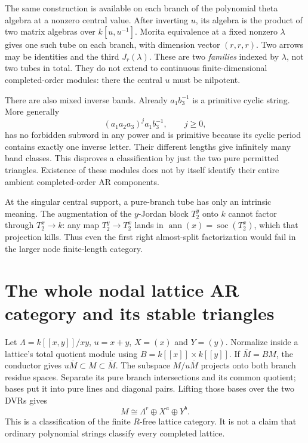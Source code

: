 The same construction is available on each branch of the polynomial theta
algebra at a nonzero central value. After inverting $u$, its algebra is the
product of two matrix algebras over $k[u,u^{-1}]$. Morita equivalence at a
fixed nonzero $\lambda$ gives one such tube on each branch, with dimension
vector $(r,r,r)$. Two arrows may be identities and the third $J_r(\lambda)$.
These are two \emph{families} indexed by $\lambda$, not two tubes in total.
They do not extend to continuous finite-dimensional completed-order modules:
there the central $u$ must be nilpotent.

There are also mixed inverse bands. Already $a_1b_3^{-1}$ is a primitive
cyclic string. More generally
\[
 (a_1a_2a_3)^j a_1b_3^{-1},\qquad j\ge0,
\]
has no forbidden subword in any power and is primitive because its cyclic
period contains exactly one inverse letter. Their different lengths give
infinitely many band classes. This disproves a classification by just the
two pure permitted triangles. Existence of these modules does not by itself
identify their entire ambient completed-order AR components.

At the singular central support, a pure-branch tube has only an intrinsic
meaning. The augmentation of the $y$-Jordan block $T_2^y$ onto $k$ cannot
factor through $T_2^x\to k$: any map $T_2^y\to T_2^x$ lands in
$\operatorname{ann}(x)=\operatorname{soc}(T_2^x)$, which that projection kills.
Thus even the first right almost-split factorization would fail in the larger
node finite-length category.

\section[Nodal lattice AR geometry]{The whole nodal lattice AR category and its stable triangles}
Let $\Lambda=k[[x,y]]/xy$, $u=x+y$, $X=(x)$ and $Y=(y)$. Normalize inside a
lattice's total quotient module using $B=k[[x]]\times k[[y]]$. If
$\overline M=BM$, the conductor gives
$u\overline M\subset M\subset\overline M$. The subspace
$M/u\overline M$ projects onto both branch residue spaces. Separate its pure
branch intersections and its common quotient; bases put it into pure lines
and diagonal pairs. Lifting those bases over the two DVRs gives
\begin{equation}\label{arb:nodeclassification}
 M\cong\Lambda^r\oplus X^a\oplus Y^b.
\end{equation}
This is a classification of the finite $R$-free lattice category. It is not a
claim that ordinary polynomial strings classify every completed lattice.

